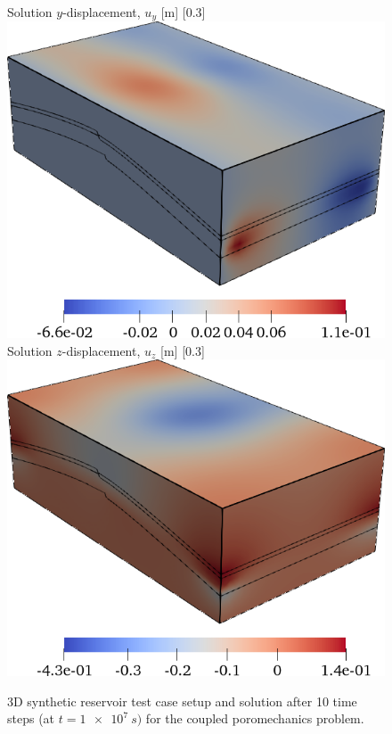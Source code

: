 \begin{figure} [htbp]
    {
        Solution $y$-displacement, $u_y$ [\unit{m}]
        \label{fig:mazumodel2_geosx_sol_y}
    }
    [0.3\textwidth]
    {
        \includegraphics[width=\linewidth]{figs/MazuModel2/geosx/poro_sol_y}
    }
    \hfill
    \subcaptionbox
    {
        Solution $z$-displacement, $u_z$ [\unit{m}]
        \label{fig:mazumodel2_geosx_sol_z}
    }
    [0.3\textwidth]
    {
        \includegraphics[width=\linewidth]{figs/MazuModel2/geosx/poro_sol_z}
    }
    \caption[3D synthetic reservoir test case setup]{3D synthetic reservoir test case setup and solution after 10 time steps (at $t = \qty{1e7}{s})$ for the coupled poromechanics problem.}
    \label{fig:mazumodel2_geosx_setup}
\end{figure}

